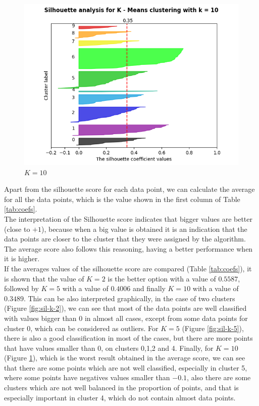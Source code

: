 \documentclass[12pt]{article}
\begin{document}
\begin{figure}[H]
\begin{minipage}{0.32\textwidth}
     \caption{$K = 5$}
     \label{fig:sil-k-5}
   \end{minipage}
   \begin{minipage}{0.32\textwidth}
     \centering
     \includegraphics[width=\linewidth]{assignment-1/plots/silhouette-plot-k-10.png}
     \caption{$K=10$}
     \label{fig:sil-k-10}
   \end{minipage}
\end{figure}

Apart from the silhouette score for each data point, we can calculate the average for all the data points, which is the value shown in the first column of Table \ref{tab:coefs}. \\

The interpretation of the Silhouette score indicates that bigger values are better (close to $+1$), because when a big value is obtained it is an indication that the data points are closer to the cluster that they were assigned by the algorithm. The average score also follows this reasoning, having a better performance when it is higher.\\

If the averages values of the silhouette score are compared (Table \ref{tab:coefs}), it is shown that the value of $K=2$ is the better option with a value of $0.5587$, followed by $K=5$ with a value of $0.4006$ and finally $K=10$ with a value of $0.3489$. This can be also interpreted graphically, in the case of two clusters (Figure \ref{fig:sil-k-2}), we can see that most of the data points are well classified with values bigger than $0$ in almost all cases, except from some data points for cluster 0, which can be considered as outliers. For $K=5$ (Figure \ref{fig:sil-k-5}), there is also a good classification in most of the cases, but there are more points that have values smaller than $0$, on clusters 0,1,2 and 4. Finally, for $K=10$ (Figure \ref{fig:sil-k-10}), which is the worst result obtained in the average score, we can see that there are some points which are not well classified, especially in cluster 5, where some points have negatives values smaller than $-0.1$, also there are some clusters which are not well balanced in the proportion of points, and that is especially important in cluster 4, which do not contain almost data points.
\end{document}
